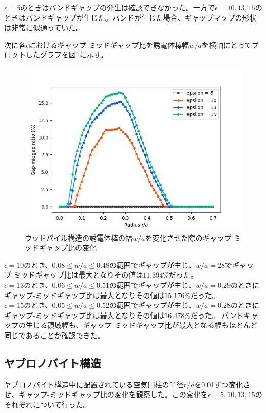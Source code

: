 \documentclass[platex,dvipdfmx]{jsreport}
\numberwithin{equation}{section}
\begin{document}
$\epsilon = 5$のときはバンドギャップの発生は確認できなかった。一方で$\epsilon = 10, 13, 15$のときはバンドギャップが生じた。バンドが生じた場合、ギャップマップの形状は非常に似通っていた。

次に各$\epsilon$におけるギャップ-ミッドギャップ比を誘電体棒幅$w / a$を横軸にとってプロットしたグラフを図\ref{fig:woodpile}に示す。 



\begin{figure}[htbp]
  \centering
  \includegraphics[width=0.8\linewidth]{results/gap_midgap_ratio/woodpile-2.png}
  \caption{ウッドパイル構造の誘電体棒の幅$w / a$を変化させた際のギャップ-ミッドギャップ比の変化}
  \label{fig:woodpile}
\end{figure}

$\epsilon = 10$のとき、$0.08 \leq w / a \leq 0.48$の範囲でギャップが生じ、$ w / a = 28$でギャップ-ミッドギャップ比は最大となりその値は$11.394 \%$だった。\\
$\epsilon = 13$のとき、$0.06 \leq w / a \leq 0.51$の範囲でギャップが生じ、$w / a = 0.29$のときにギャップ-ミッドギャップ比は最大となりその値は$15.176 \%$だった。\\
$\epsilon = 15$のとき、$0.05 \leq w / a \leq 0.52$の範囲でギャップが生じ、$w / a = 0.28$のときにギャップ-ミッドギャップ比は最大となりその値は$16.478 \%$だった。
バンドギャップの生じる領域幅も、ギャップ-ミッドギャップ比が最大となる幅もほとんど同じであることが確認できた。

\clearpage
\subsection{ヤブロノバイト構造}
ヤブロノバイト構造中に配置されている空気円柱の半径$r / a$を0.01ずつ変化させ、ギャップ-ミッドギャップ比の変化を観察した。この変化を$\epsilon = 5, 10, 13, 15$のそれぞれについて行った。
\end{document}
